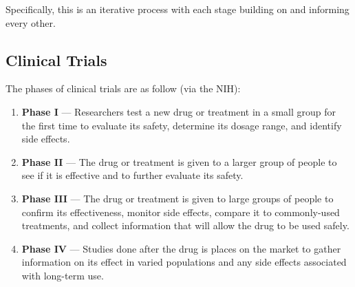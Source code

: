 Specifically, this is an iterative process with each stage building on and informing every other.

\subsection{Clinical Trials}

The phases of clinical trials are as follow (via the NIH):
\begin{enumerate}
	\item \textbf{Phase I} --- Researchers test a new drug or treatment in a small group for the first time to evaluate its safety, determine its dosage range, and identify side effects.
	
	\item \textbf{Phase II} --- The drug or treatment is given to a larger group of people to see if it is effective and to further evaluate its safety.
	
	\item \textbf{Phase III} --- The drug or treatment is given to large groups of people to confirm its effectiveness, monitor side effects, compare it to commonly-used treatments, and collect information that will allow the drug to be used safely.
	
	\item \textbf{Phase IV} --- Studies done after the drug is places on the market to gather information on its effect in varied populations and any side effects associated with long-term use.
\end{enumerate}